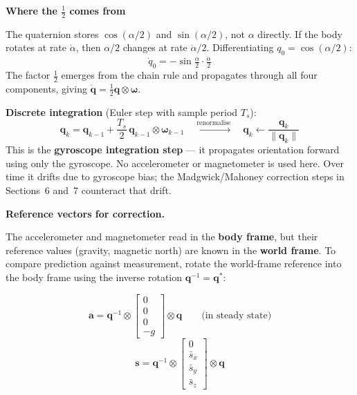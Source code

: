 \documentclass[12pt, a4paper]{article}
\begin{document}
\begin{notebox}
  \textbf{Where the $\tfrac{1}{2}$ comes from}

  The quaternion stores $\cos(\alpha/2)$ and $\sin(\alpha/2)$, not $\alpha$
  directly.
  If the body rotates at rate $\dot{\alpha}$, then $\alpha/2$ changes at
  rate $\dot{\alpha}/2$.
  Differentiating $q_0 = \cos(\alpha/2)$:
  \[
    \dot{q}_0 = -\sin\!\tfrac{\alpha}{2}\cdot\tfrac{\dot{\alpha}}{2}
  \]
  The factor $\tfrac{1}{2}$ emerges from the chain rule and propagates
  through all four components, giving $\dot{\mathbf{q}} =
  \tfrac{1}{2}\mathbf{q}\otimes\boldsymbol{\omega}$.

  \textbf{Discrete integration} (Euler step with sample period $T_s$):
  \[
    \mathbf{q}_k
    = \mathbf{q}_{k-1} + \frac{T_s}{2}\,\mathbf{q}_{k-1}
      \otimes \boldsymbol{\omega}_{k-1}
    \quad\xrightarrow{\text{renormalise}}\quad
    \mathbf{q}_k \leftarrow \frac{\mathbf{q}_k}{\|\mathbf{q}_k\|}
  \]
  This is the \textbf{gyroscope integration step} --- it propagates
  orientation forward using only the gyroscope.
  No accelerometer or magnetometer is used here.
  Over time it drifts due to gyroscope bias; the Madgwick/Mahoney
  correction steps in Sections~6 and~7 counteract that drift.
\end{notebox}

\textbf{Reference vectors for correction.}

The accelerometer and magnetometer read in the \textbf{body frame}, but
their reference values (gravity, magnetic north) are known in the
\textbf{world frame}.
To compare prediction against measurement, rotate the world-frame reference
into the body frame using the inverse rotation $\mathbf{q}^{-1} =
\mathbf{q}^*$:

\[
  \mathbf{a}
  = \mathbf{q}^{-1} \otimes
    \begin{bmatrix} 0 \\ 0 \\ 0 \\ -g \end{bmatrix}
    \otimes \mathbf{q}
  \qquad\text{(in steady state)}
\]
\[
  \mathbf{s}
  = \mathbf{q}^{-1} \otimes
    \begin{bmatrix} 0 \\ \bar{s}_x \\ \bar{s}_y \\ \bar{s}_z \end{bmatrix}
    \otimes \mathbf{q}
\]
\end{document}
